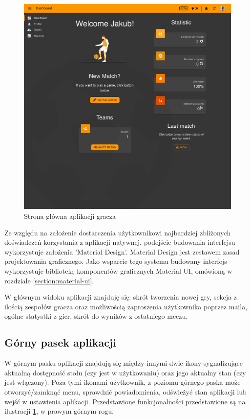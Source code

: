 \begin{figure}[h!]
  \centering
    \includegraphics[width=\textwidth]{images/player/dashboard.png}
  \caption{Strona główna aplikacji gracza}
  \label{fig:dashboard}
\end{figure}

Ze względu na założenie dostarczenia użytkownikowi najbardziej zbliżonych doświadczeń korzystania z aplikacji natywnej, podejście budowania interfejsu wykorzystuje założenia 'Material Design'. Material Design jest zestawem zasad projektowania graficznego. Jako wsparcie tego systemu budowany interfejs wykorzystuje bibliotekę komponentów graficznych Material UI, omówioną w rozdziale \ref{section:material-ui}.

W głównym widoku aplikacji znajduję się: skrót tworzenia nowej gry, sekcja z ilością zespołów gracza oraz możliwością zaproszenia użytkownika poprzez maila, ogólne statystki z gier, skrót do wyników z ostatniego meczu.

\subsection{Górny pasek aplikacji}

W górnym pasku aplikacji znajdują się między innymi dwie ikony sygnalizujące aktualną dostępność stołu (czy jest w użytkowaniu) oraz jego aktualny stan (czy jest włączony). Poza tymi ikonami użytkownik, z poziomu górnego paska może otworzyć/zamknąć menu, sprawdzić powiadomienia, odświeżyć stan aplikacji lub wejść w ustawienia aplikacji. Przedstawione funkcjonalności przedstawione są na ilustracji \ref{fig:dashboard}, w prawym górnym rogu.

